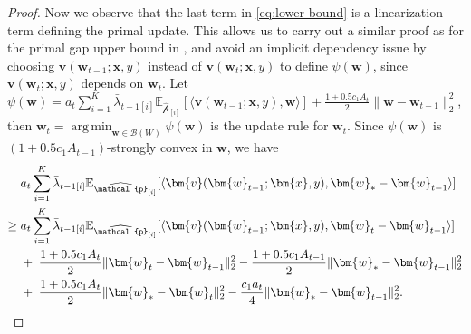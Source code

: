 \documentclass[11pt]{article}
\numberwithin{thm}{section}
\theoremstyle{plain}
\theoremstyle{definition}
\theoremstyle{remark} \newtheorem{remark}[thm]{Remark}
\def\vv{{\bm{v}}}
\def\vw{{\bm{w}}}
\def\vx{{\bm{x}}}
\def\ep{\widehat{\mathcal{p}}}
\def\cB{{\mathcal{B}}}
\newcommand{\E}{\mathbb{E}}
\DeclareMathOperator*{\argmin}{arg\,min}
\newcommand{\innp}[1]{\langle #1 \rangle}
\newcommand{\epi}{\ep_{[i]}}
\begin{document}
\begin{proof}
Now we observe that the last term in \eqref{eq:lower-bound} is a linearization term defining the primal update. This allows us to carry out a similar proof as for the primal gap upper bound in , and avoid an implicit dependency issue by choosing \(\vv(\vw_{t-1};\vx,y)\) instead of \(\vv(\vw_{t};\vx,y)\) to define \(\psi(\vw)\), since \(\vv(\vw_t;\vx,y)\) depends on \(\vw_t\). Let \(\psi(\vw)=a_t\sum_{i=1}^K\bar{\lambda}_{t-1[i]}\E_{\epi}[\innp{\vv(\vw_{t-1};\vx,y), \vw}]+\frac{1+0.5c_1A_t}{2}\|\vw-\vw_{t-1}\|_2^2\), then \(\vw_t=\argmin_{\vw\in\cB(W)}\psi(\vw)\) is the update rule for \(\vw_t\). Since \(\psi(\vw)\) is \((1+0.5c_1A_{t-1})\)-strongly convex in \(\vw\), we have 
	\begin{align}
		&a_t\sum_{i=1}^K\bar{\lambda}_{t-1[i]}\E_{\epi}[\innp{\vv(\vw_{t-1};\vx,y), \vw_*-\vw_{t-1}}] \notag \\ 
        \geq\;& a_t\sum_{i=1}^K\bar{\lambda}_{t-1[i]}\E_{\epi}[\innp{\vv(\vw_{t-1};\vx,y), \vw_t-\vw_{t-1}}] \notag \\
        &+ \;\frac{1+0.5c_1A_t}{2}\|\vw_t-\vw_{t-1}\|_2^2-\frac{1+0.5c_1A_{t-1}}{2}\|\vw_*-\vw_{t-1}\|_2^2 \notag \\
		&+ \;\frac{1+0.5c_1A_t}{2}\|\vw_*-\vw_t\|_2^2-\frac{c_1a_t}{4}\|\vw_*-\vw_{t-1}\|_2^2.\label{eq:St-term1}
	\end{align}



\end{proof}
\end{document}
